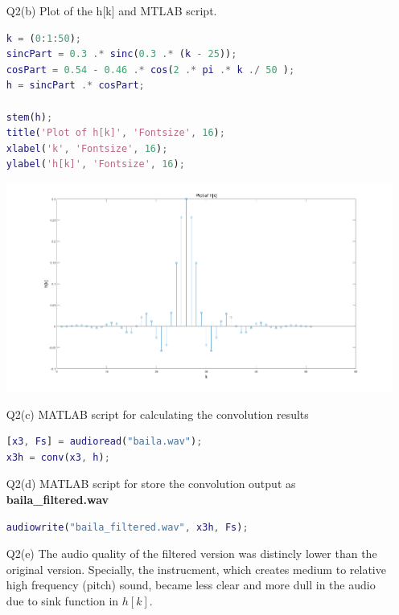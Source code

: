 \documentclass{article}
\begin{document}
\begin{enumerate}
\item[Q2(b)] Plot of the h[k] and MTLAB script.

\begin{lstlisting}[language=Matlab]
k = (0:1:50);
sincPart = 0.3 .* sinc(0.3 .* (k - 25));
cosPart = 0.54 - 0.46 .* cos(2 .* pi .* k ./ 50 );
h = sincPart .* cosPart;

stem(h);
title('Plot of h[k]', 'Fontsize', 16);
xlabel('k', 'Fontsize', 16);
ylabel('h[k]', 'Fontsize', 16);
\end{lstlisting}

\includegraphics[width=\textwidth]{Question2B.png}

\item[Q2(c)] MATLAB script for calculating the convolution results
\begin{lstlisting}[language=Matlab]
[x3, Fs] = audioread("baila.wav");
x3h = conv(x3, h);
\end{lstlisting}

\item[Q2(d)] MATLAB script for store the convolution output as \textbf{baila\_filtered.wav} 

\begin{lstlisting}[language=Matlab]
audiowrite("baila_filtered.wav", x3h, Fs);
\end{lstlisting}

\item[Q2(e)] The audio quality of the filtered version was distincly lower than the 
original version. Specially, the instrucment, which creates medium to relative high
 frequency (pitch) sound, became less clear and more dull in the audio due to sink 
 function in $h[k]$.

\end{enumerate}
\end{document}

